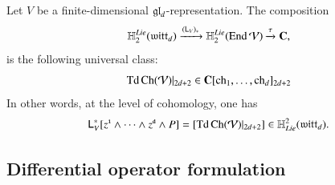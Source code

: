 \documentclass[main.tex]{subfiles}
\begin{document}
\begin{theorem}\label{thm:grr} 
  Let $V$ be a finite-dimensional $\mathfrak{gl}_d$-representation.
  The composition
\begin{equation}\label{}
  \mathbb H_2^{Lie}(\mathfrak{witt}_d) \xrightarrow{(\mathsf L_V)_*} \mathbb H_2^{Lie}( \operatorname{End} \mathcal V) \xrightarrow{\tau} \mathbf{C} ,
\end{equation}
is the following universal class:
  \begin{equation}\label{}
    \operatorname{Td} \operatorname{Ch}(\mathcal V)|_{2d+2} \in \mathbf{C}[\operatorname{ch}_1,\ldots,\operatorname{ch}_d]_{2d+2}
  \end{equation}
  In other words, at the level of cohomology, one has 
  \begin{equation}\label{}
    \mathsf L^*_V [z^{\textbf{\texttt{\tiny{1}}}} \wedge \cdots \wedge z^{\textbf{\texttt{\tiny{d}}}} \wedge P] = \left[\operatorname{Td} \operatorname{Ch}(\mathcal V)|_{2d+2}\right] \in \mathbb H^2_{Lie}(\mathfrak{witt}_d) .
  \end{equation}
\end{theorem}

\subsection{Differential operator formulation} 
\end{document}
